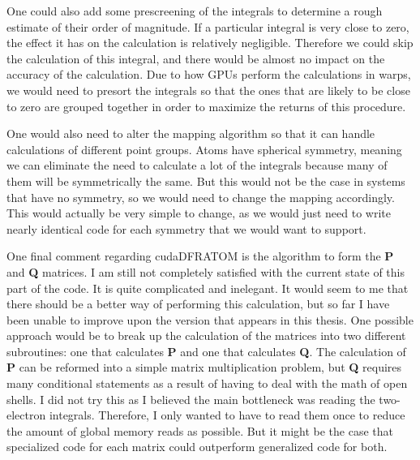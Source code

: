 One could also add some prescreening of the integrals to determine a rough estimate of their order of magnitude. If a particular integral is very close to zero, the effect it has on the calculation is relatively negligible. Therefore we could skip the calculation of this integral, and there would be almost no impact on the accuracy of the calculation. Due to how GPUs perform the calculations in warps, we would need to presort the integrals so that the ones that are likely to be close to zero are grouped together in order to maximize the returns of this procedure.

One would also need to alter the mapping algorithm so that it can handle calculations of different point groups. Atoms have spherical symmetry, meaning we can eliminate the need to calculate a lot of the integrals because many of them will be symmetrically the same. But this would not be the case in systems that have no symmetry, so we would need to change the mapping accordingly. This would actually be very simple to change, as we would just need to write nearly identical code for each symmetry that we would want to support.

One final comment regarding cudaDFRATOM is the algorithm to form the \textbf{P} and \textbf{Q} matrices. I am still not completely satisfied with the current state of this part of the code. It is quite complicated and inelegant. It would seem to me that there should be a better way of performing this calculation, but so far I have been unable to improve upon the version that appears in this thesis. One possible approach would be to break up the calculation of the matrices into two different subroutines: one that calculates \textbf{P} and one that calculates \textbf{Q}. The calculation of \textbf{P} can be reformed into a simple matrix multiplication problem, but \textbf{Q} requires many conditional statements as a result of having to deal with the math of open shells. I did not try this as I believed the main bottleneck was reading the two-electron integrals. Therefore, I only wanted to have to read them once to reduce the amount of global memory reads as possible. But it might be the case that specialized code for each matrix could outperform generalized code for both.

